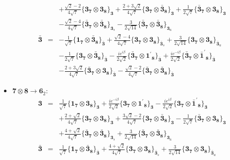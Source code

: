 \documentclass[english]{article}
\newcommand{\subcg}[3]{\big\{ {#1}\otimes{#2}\big\}^{}_{#3}}
\newcommand{\rep}[1]{\mathbf{#1}}
\begin{document}
\begin{itemize}
\begin{eqnarray*}
 & & +\frac{\sqrt{2}-2}{4 \sqrt{7}}\subcg{\rep{3}_{\rep{7}}}{\rep{3}_{\rep{8}}}{\rep{3}}+\frac{2+3 \sqrt{2}}{4 \sqrt{7}}\subcg{\rep{3}_{\rep{7}}}{\rep{\bar{3}}_{\rep{8}}}{\rep{3}}+\frac{1}{2 \sqrt{7}}\subcg{\rep{\bar{3}}_{\rep{7}}}{\rep{3}_{\rep{8}}}{\rep{3}} \\ 
 & & -\frac{\sqrt{2}-4}{4 \sqrt{7}}\subcg{\rep{\bar{3}}_{\rep{7}}}{\rep{\bar{3}}_{\rep{8}}}{\rep{3}_{s}}-\frac{3}{2 \sqrt{14}}\subcg{\rep{\bar{3}}_{\rep{7}}}{\rep{\bar{3}}_{\rep{8}}}{\rep{3}_{a}}
\\
\rep{\bar{3}} &=& -\frac{1}{\sqrt{7}}\subcg{\rep{1}_{\rep{7}}}{\rep{\bar{3}}_{\rep{8}}}{\rep{\bar{3}}}+\frac{\sqrt{2}-4}{4 \sqrt{7}}\subcg{\rep{3}_{\rep{7}}}{\rep{3}_{\rep{8}}}{\rep{\bar{3}}_{s}}+\frac{3}{2 \sqrt{14}}\subcg{\rep{3}_{\rep{7}}}{\rep{3}_{\rep{8}}}{\rep{\bar{3}}_{a}} \\ 
 & & -\frac{1}{2 \sqrt{7}}\subcg{\rep{3}_{\rep{7}}}{\rep{\bar{3}}_{\rep{8}}}{\rep{\bar{3}}}-\frac{i e^{i \beta }}{2 \sqrt{2}}\subcg{\rep{\bar{3}}_{\rep{7}}}{\rep{1^{\prime}}_{\rep{8}}}{\rep{\bar{3}}}+\frac{i e^{-i \beta }}{2 \sqrt{2}}\subcg{\rep{\bar{3}}_{\rep{7}}}{\rep{\bar{1}^{\prime}}_{\rep{8}}}{\rep{\bar{3}}} \\ 
 & & -\frac{2+3 \sqrt{2}}{4 \sqrt{7}}\subcg{\rep{\bar{3}}_{\rep{7}}}{\rep{3}_{\rep{8}}}{\rep{\bar{3}}}-\frac{\sqrt{2}-2}{4 \sqrt{7}}\subcg{\rep{\bar{3}}_{\rep{7}}}{\rep{\bar{3}}_{\rep{8}}}{\rep{\bar{3}}}
\end{eqnarray*}
\item $\rep{7}\otimes\rep{8}\to\rep{6}_{2}$:
\begin{eqnarray*}
\rep{3} &=& \frac{1}{\sqrt{7}}\subcg{\rep{1}_{\rep{7}}}{\rep{3}_{\rep{8}}}{\rep{3}}+\frac{i e^{-i \beta }}{2 \sqrt{2}}\subcg{\rep{3}_{\rep{7}}}{\rep{1^{\prime}}_{\rep{8}}}{\rep{3}}-\frac{i e^{i \beta }}{2 \sqrt{2}}\subcg{\rep{3}_{\rep{7}}}{\rep{\bar{1}^{\prime}}_{\rep{8}}}{\rep{3}} \\ 
 & & +\frac{2+\sqrt{2}}{4 \sqrt{7}}\subcg{\rep{3}_{\rep{7}}}{\rep{3}_{\rep{8}}}{\rep{3}}+\frac{3 \sqrt{2}-2}{4 \sqrt{7}}\subcg{\rep{3}_{\rep{7}}}{\rep{\bar{3}}_{\rep{8}}}{\rep{3}}-\frac{1}{2 \sqrt{7}}\subcg{\rep{\bar{3}}_{\rep{7}}}{\rep{3}_{\rep{8}}}{\rep{3}} \\ 
 & & +\frac{4+\sqrt{2}}{4 \sqrt{7}}\subcg{\rep{\bar{3}}_{\rep{7}}}{\rep{\bar{3}}_{\rep{8}}}{\rep{3}_{s}}+\frac{3}{2 \sqrt{14}}\subcg{\rep{\bar{3}}_{\rep{7}}}{\rep{\bar{3}}_{\rep{8}}}{\rep{3}_{a}}
\\
\rep{\bar{3}} &=& \frac{1}{\sqrt{7}}\subcg{\rep{1}_{\rep{7}}}{\rep{\bar{3}}_{\rep{8}}}{\rep{\bar{3}}}+\frac{4+\sqrt{2}}{4 \sqrt{7}}\subcg{\rep{3}_{\rep{7}}}{\rep{3}_{\rep{8}}}{\rep{\bar{3}}_{s}}+\frac{3}{2 \sqrt{14}}\subcg{\rep{3}_{\rep{7}}}{\rep{3}_{\rep{8}}}{\rep{\bar{3}}_{a}} \\ 

\end{eqnarray*}
\end{itemize}
\end{document}
